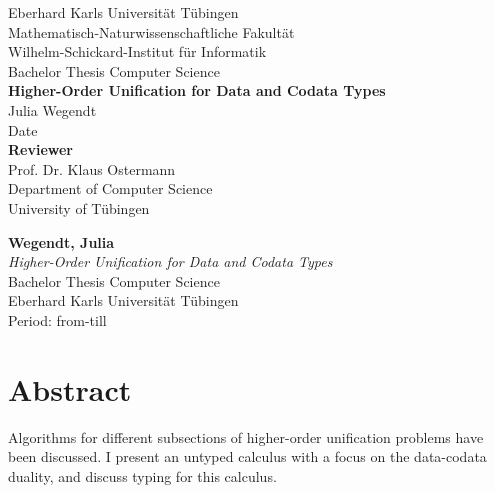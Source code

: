 \documentclass[twoside,12pt,a4paper]{article}
\begin{document}
\begin{titlepage}
 \begin{center}
  {\LARGE Eberhard Karls Universität Tübingen}\\
  {\large Mathematisch-Naturwissenschaftliche Fakultät \\
Wilhelm-Schickard-Institut für Informatik\\[4cm]}
  {\huge Bachelor Thesis Computer Science\\[2cm]}
  {\Large\bf  Higher-Order Unification for Data and Codata Types\\[1.5cm]}
 {\large Julia Wegendt}\\[0.5cm]
Date\\[3cm]
{\small\bf Reviewer}\\[0.5cm]
 {\large Prof. Dr. Klaus Ostermann}\\
  {\footnotesize Department of Computer Science\\
	University of Tübingen}
\end{center}
	
\end{titlepage}

\thispagestyle{empty}
\vspace*{\fill}
\begin{minipage}{11.2cm}
\textbf{Wegendt, Julia}\\
\emph{Higher-Order Unification for Data and Codata Types}\\ Bachelor Thesis Computer Science\\
Eberhard Karls Universität Tübingen\\
Period: from-till
\end{minipage}
\newpage


\setcounter{page}{1}


\section*{Abstract}

Algorithms for different subsections of higher-order unification problems have been discussed.
I present an untyped calculus with a focus on the data-codata duality, 
and discuss typing for this calculus.
\end{document}
